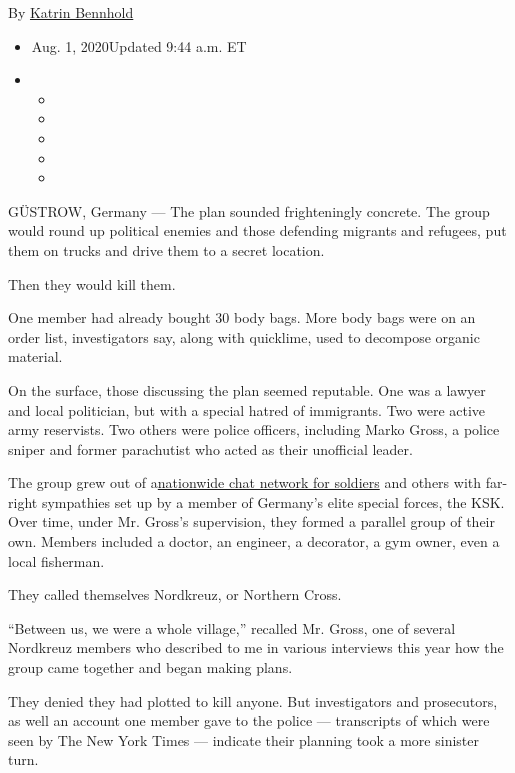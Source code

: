 By \href{https://www.nytimes.com/by/katrin-bennhold}{Katrin Bennhold}

\begin{itemize}
\item
  Aug. 1, 2020Updated 9:44 a.m. ET
\item
  \begin{itemize}
  \item
  \item
  \item
  \item
  \item
  \end{itemize}
\end{itemize}

GÜSTROW, Germany --- The plan sounded frighteningly concrete. The group
would round up political enemies and those defending migrants and
refugees, put them on trucks and drive them to a secret location.

Then they would kill them.

One member had already bought 30 body bags. More body bags were on an
order list, investigators say, along with quicklime, used to decompose
organic material.

On the surface, those discussing the plan seemed reputable. One was a
lawyer and local politician, but with a special hatred of immigrants.
Two were active army reservists. Two others were police officers,
including Marko Gross, a police sniper and former parachutist who acted
as their unofficial leader.

The group grew out of
a\href{https://www.nytimes.com/2020/07/03/world/europe/germany-military-neo-nazis-ksk.html?searchResultPosition=2}{nationwide
chat network for soldiers} and others with far-right sympathies set up
by a member of Germany's elite special forces, the KSK. Over time, under
Mr. Gross's supervision, they formed a parallel group of their own.
Members included a doctor, an engineer, a decorator, a gym owner, even a
local fisherman.

They called themselves Nordkreuz, or Northern Cross.

``Between us, we were a whole village,'' recalled Mr. Gross, one of
several Nordkreuz members who described to me in various interviews this
year how the group came together and began making plans.

They denied they had plotted to kill anyone. But investigators and
prosecutors, as well an account one member gave to the police ---
transcripts of which were seen by The New York Times --- indicate their
planning took a more sinister turn.

